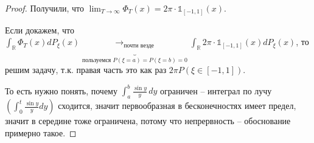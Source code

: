 \begin{proof}
    Получили, что $\lim_{T \to \infty} \Phi_T(x) = 2 \pi \cdot \mathds{1}_{[-1, 1]} (x)$.

    Если докажем, что $\int_{\mathbb{R}} \Phi_{T} (x) d P_{\xi}(x) \underbrace{\to_{\text{почти везде}}}_{\text{пользуемся } P(\xi = a) = P(\xi = b) = 0 } \int_{\mathbb{R}} 2 \pi \cdot \mathds{1}_{[-1, 1]} (x) d P_{\xi}(x)$, то решим задачу, т.к. правая часть это как раз $2 \pi P(\xi \in [-1, 1])$.

    То есть нужно понять, почему $\int_{a}^b \frac{\sin y}{y} \, dy$ ограничен -- интеграл по лучу $\left( \int_{0}^{t} \frac{\sin{y}}{y} dy \right)$ сходится, значит первообразная в бесконечностях имеет предел, значит в середине тоже ограничена, потому что непрервность -- обоснование примерно такое.

\end{proof}

